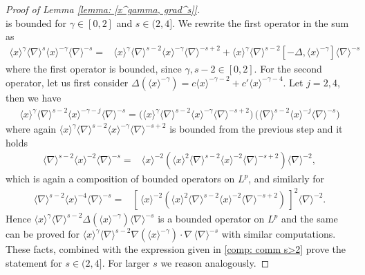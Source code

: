 \documentclass[10pt,a4paper]{amsart}
\begin{document}
\begin{proof}[Proof of Lemma \ref{lemma: [x^gamma, grad^s]}]
\begin{equation*}
     \end{equation*}
     is bounded for $\gamma \in [0,2]$ and $s \in (2, 4]$. We rewrite the first operator in the sum as 
     \begin{align}
     \label{comp: comm s>2}
         \langle x \rangle^\gamma \langle \nabla \rangle^s \langle x \rangle^{-\gamma }\langle \nabla \rangle^{-s} =& \langle x \rangle^\gamma \langle \nabla \rangle^{s-2} \langle x \rangle^{-\gamma }\langle \nabla \rangle^{-s+2} + \langle x \rangle^\gamma \langle \nabla \rangle^{s-2} [-\Delta , \langle x \rangle^{-\gamma}]\langle \nabla \rangle^{-s}
     \end{align}
     where the first operator is bounded, since $\gamma, s-2 \in [0,2]$. For the second operator, let us first consider $ \Delta (\langle x \rangle^{-\gamma}) = c \langle x \rangle^{-\gamma-2} + c' \langle x \rangle^{-\gamma-4} $. Let $ j =2,4$, then we have
     \begin{align*}
          \langle x \rangle^\gamma \langle \nabla \rangle^{s-2} \langle x \rangle^{-\gamma-j} \langle \nabla \rangle^{-s} = \big(\langle x \rangle^\gamma \langle \nabla \rangle^{s-2} \langle x \rangle^{-\gamma}\langle \nabla \rangle^{-s +2}\big)\,\big( \langle \nabla \rangle^{s -2} \langle x \rangle^{-j}  \langle \nabla \rangle^{-s} \big)
     \end{align*}
     where again $\langle x \rangle^\gamma \langle \nabla \rangle^{s-2} \langle x \rangle^{-\gamma}\langle \nabla \rangle^{-s +2}$ is bounded from the previous step and it holds 
     \begin{align*}
         \langle \nabla \rangle^{s -2} \langle x \rangle^{-2}  \langle \nabla \rangle^{-s}  = &  \langle x \rangle^{-2}(\langle x \rangle^{2}\langle \nabla \rangle^{s -2} \langle x \rangle^{-2}  \langle \nabla \rangle^{-s+2}) \langle \nabla \rangle^{-2} ,
     \end{align*}
     which is again a composition of bounded operators on $L^p$, and similarly for 
     \begin{align*}
         \langle \nabla \rangle^{s -2} \langle x \rangle^{-4}  \langle \nabla \rangle^{-s}  = &[\, \langle x \rangle^{-2}(\langle x \rangle^{2}\langle \nabla \rangle^{s -2} \langle x \rangle^{-2}  \langle \nabla \rangle^{-s+2})\,]^2 \langle \nabla \rangle^{-2}.
     \end{align*}
          Hence $ \langle x \rangle^\gamma \langle \nabla \rangle^{s-2} \Delta (\langle x \rangle^{-\gamma})\langle \nabla \rangle^{-s}$ is a bounded operator on $L^p$ and the same can be proved for $ \langle x \rangle^\gamma \langle \nabla \rangle^{s-2} \nabla (\langle x \rangle^{-\gamma})\cdot \nabla\, \langle \nabla \rangle^{-s}$ with similar computations. These facts, combined with the expression given in \eqref{comp: comm s>2} prove the statement for $s \in (2, 4]$. For larger $s$ we reason analogously. 
    \end{proof}
\end{document}
